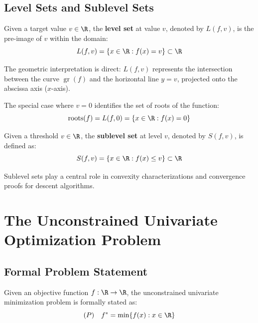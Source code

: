 \subsection{Level Sets and Sublevel Sets}
\begin{definition}
Given a target value $v \in \R$, the \textbf{level set} at value $v$, denoted by $L(f, v)$, is the pre-image of $v$ within the domain:
\begin{equation}
L(f, v) = \left\{ x \in \R : f(x) = v \right\} \subset \R
\end{equation}
\end{definition}

The geometric interpretation is direct: $L(f, v)$ represents the intersection between the curve $\operatorname{gr}(f)$ and the horizontal line $y = v$, projected onto the abscissa axis ($x$-axis).

\begin{remark}
The special case where $v = 0$ identifies the set of roots of the function:
\begin{equation}
\operatorname{roots}(f) = L(f, 0) = \{ x \in \R : f(x) = 0 \}
\end{equation}
\end{remark}

\begin{definition}
Given a threshold $v \in \R$, the \textbf{sublevel set} at level $v$, denoted by $S(f, v)$, is defined as:
\begin{equation}
S(f, v) = \left\{ x \in \R : f(x) \le v \right\} \subset \R
\end{equation}
\end{definition}
Sublevel sets play a central role in convexity characterizations and convergence proofs for descent algorithms.


\FloatBarrier
\section{The Unconstrained Univariate Optimization Problem}
\label{sec:opt-unconstrained-problem}

\subsection{Formal Problem Statement}
Given an objective function $f: \R \to \R$, the unconstrained univariate minimization problem is formally stated as:
\begin{equation}
(P) \quad f^* = \min \{ f(x) : x \in \R \}
\end{equation}

